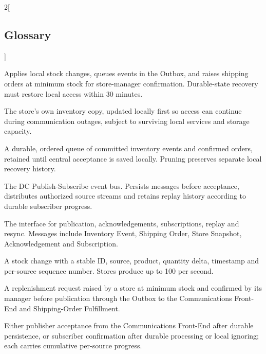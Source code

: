 \begingroup
\footnotesize
\setlength{\multicolsep}{4pt}
\begin{multicols}{2}[\subsection{Glossary}\label{sec:glossary}]
\begin{description}[style=unboxed,leftmargin=1em,labelindent=0pt,itemsep=0.5pt,parsep=0pt]
\item[Store Agent] Applies local stock changes, queues events in the Outbox, and raises shipping orders at minimum stock for store-manager confirmation. Durable-state recovery must restore local access within 30 minutes.
\item[Store-Local Inventory] The store's own inventory copy, updated locally first so access can continue during communication outages, subject to surviving local services and storage capacity.
\item[Outbox] A durable, ordered queue of committed inventory events and confirmed orders, retained until central acceptance is saved locally. Pruning preserves separate local recovery history.
\item[Communications Front-End (CFE)] The DC Publish-Subscribe event bus. Persists messages before acceptance, distributes authorized source streams and retains replay history according to durable subscriber progress.
\item[Inventory Exchange Protocol (IEP)] The interface for publication, acknowledgements, subscriptions, replay and resync. Messages include Inventory Event, Shipping Order, Store Snapshot, Acknowledgement and Subscription.
\item[Inventory Event] A stock change with a stable ID, source, product, quantity delta, timestamp and per-source sequence number. Stores produce up to 100 per second.
\item[Shipping Order] A replenishment request raised by a store at minimum stock and confirmed by its manager before publication through the Outbox to the Communications Front-End and Shipping-Order Fulfillment.
\item[Acknowledgement] Either publisher acceptance from the Communications Front-End after durable persistence, or subscriber confirmation after durable processing or local ignoring; each carries cumulative per-source progress.

\end{description}
\end{multicols}
